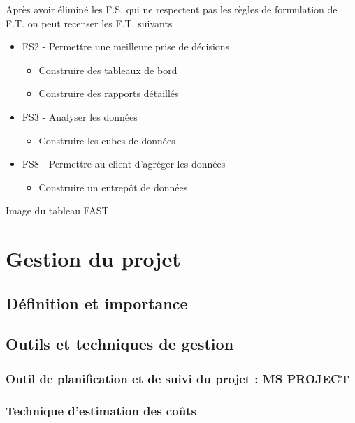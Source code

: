 Après avoir éliminé les F.S. qui ne respectent pas les règles de formulation de F.T. on peut recenser les F.T. suivants
\begin{itemize}
    \item FS2 - Permettre une meilleure prise de décisions 
    \begin{itemize}
        \item Construire des tableaux de bord
        \item Construire des rapports détaillés
    \end{itemize}
    \item FS3 - Analyser les données
    \begin{itemize}
        \item Construire les cubes de données 
    \end{itemize}
    \item FS8 - Permettre au client d’agréger les données
    \begin{itemize}
        \item Construire un entrepôt de données
    \end{itemize}
\end{itemize}


Image du tableau FAST



\section{Gestion du projet }
\blindtext

\subsection{Définition et importance}
\blindtext

\subsection{Outils et techniques de gestion}
\blindtext

\subsubsection{Outil de planification et de suivi du projet : MS PROJECT}
\blindtext

\subsubsection{Technique d’estimation des coûts}
\blindtext

